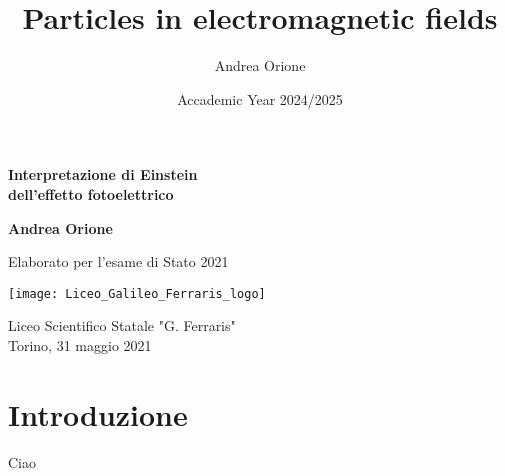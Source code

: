 \documentclass[a4paper, 12pt, twoside, titlepage]{article}
\title{Particles in electromagnetic fields}
\author{Andrea Orione}
\date{Accademic Year 2024/2025}
\begin{document}
    \begin{titlepage}
        \begin{center}
            \vspace*{1cm}

            \Huge
            \textbf{Interpretazione di Einstein\\dell'effetto fotoelettrico}


            \vspace{1.5cm}
            \LARGE
            \textbf{Andrea Orione}

            \vfill
            \Large
            Elaborato per l'esame di Stato 2021

            \vspace{0.8cm}

            \texttt{[image: Liceo\_Galileo\_Ferraris\_logo]}

            \vspace{0.8cm}
            Liceo Scientifico Statale "G. Ferraris"\\
            Torino, 31 maggio 2021

        \end{center}
    \end{titlepage}


\newpage


\section{Introduzione}
Ciao
\end{document}
